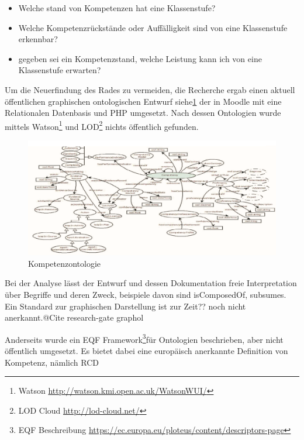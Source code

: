 \documentclass[
12pt,
english,
ngerman,
headsepline,
twoside,
openright,
numbers=noenddot,version=first
]{scrreprt}
\begin{document}
\begin{itemize}
	\item Welche stand von Kompetenzen hat eine Klassenstufe?
	\item Welche Kompetenzrückstände oder Auffälligkeit sind von eine Klassenstufe erkennbar?
	\item gegeben sei ein Kompetenzstand, welche Leistung kann ich von eine Klassenstufe erwarten?
\end{itemize}


Um die Neuerfindung des Rades zu vermeiden, die Recherche ergab einen aktuell öffentlichen graphischen ontologischen Entwurf\cite{OntoMoodle} siehe\ref{fig:competence-ontology} der in Moodle mit eine Relationalen Datenbasis und PHP umgesetzt. Nach dessen Ontologien wurde mittels Watson\footnote{Watson \url{http://watson.kmi.open.ac.uk/WatsonWUI/}} und LOD\footnote{LOD Cloud \url{http://lod-cloud.net/}} nichts öffentlich gefunden. 

\begin{figure}[h]
	\centering
	\includegraphics[width=\linewidth]{pics/competency-ontology.png}
\caption{Kompetenzontologie}
\label{fig:competence-ontology}
\end{figure}

Bei der Analyse lässt der Entwurf und dessen Dokumentation freie Interpretation über Begriffe und deren Zweck, beispiele davon sind \glqq isComposedOf\grqq, \glqq subsumes\grqq. Ein Standard zur graphischen Darstellung ist zur Zeit?? noch nicht anerkannt.@Cite research-gate graphol

Anderseits wurde ein \glqq EQF Framework\footnote{EQF Beschreibung \url{https://ec.europa.eu/ploteus/content/descriptors-page}}\grqq für Ontologien beschrieben, aber nicht öffentlich umgesetzt. Es bietet dabei eine europäisch anerkannte Definition von Kompetenz, nämlich RCD\cite{EQFCompetency}
\end{document}
